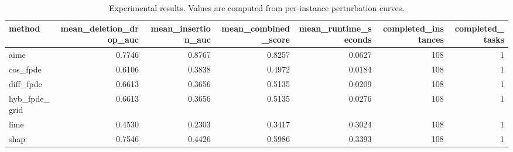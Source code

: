 \begin{table}[t]
\caption{Experimental results. Values are computed from per-instance perturbation curves.}
\label{tab:main_results_computed}
\centering
\begin{tabular}{lrrrrrr}
\toprule
method & mean\_deletion\_drop\_auc & mean\_insertion\_auc & mean\_combined\_score & mean\_runtime\_seconds & completed\_instances & completed\_tasks \\
\midrule
aime & 0.7746 & 0.8767 & 0.8257 & 0.0627 & 108 & 1 \\
cos\_fpde & 0.6106 & 0.3838 & 0.4972 & 0.0184 & 108 & 1 \\
diff\_fpde & 0.6613 & 0.3656 & 0.5135 & 0.0209 & 108 & 1 \\
hyb\_fpde\_grid & 0.6613 & 0.3656 & 0.5135 & 0.0276 & 108 & 1 \\
lime & 0.4530 & 0.2303 & 0.3417 & 0.3024 & 108 & 1 \\
shap & 0.7546 & 0.4426 & 0.5986 & 0.3393 & 108 & 1 \\
\bottomrule
\end{tabular}

\end{table}
